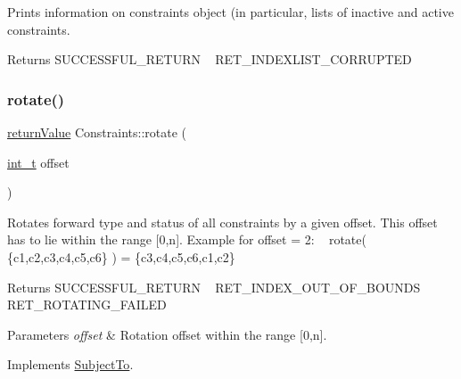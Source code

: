 Prints information on constraints object (in particular, lists of inactive and active constraints. \begin{DoxyReturn}{Returns}
S\+U\+C\+C\+E\+S\+S\+F\+U\+L\+\_\+\+R\+E\+T\+U\+RN ~\newline
 R\+E\+T\+\_\+\+I\+N\+D\+E\+X\+L\+I\+S\+T\+\_\+\+C\+O\+R\+R\+U\+P\+T\+ED 
\end{DoxyReturn}
\mbox{\label{class_constraints_a13958ee91f93760c0cb9d5a47de846f2}} 
\subsubsection{\texorpdfstring{rotate()}{rotate()}}
{\footnotesize\ttfamily \hyperlink{_message_handling_8hpp_a81d556f613bfbabd0b1f9488c0fa865e}{return\+Value} Constraints\+::rotate (\begin{DoxyParamCaption}\item[{\hyperlink{_types_8hpp_ab6fd6105e64ed14a0c9281326f05e623}{int\+\_\+t}}]{offset }\end{DoxyParamCaption})\hspace{0.3cm}{\ttfamily [virtual]}}

Rotates forward type and status of all constraints by a given offset. This offset has to lie within the range \mbox{[}0,n\mbox{]}. Example for offset = 2\+: ~\newline
rotate( \{c1,c2,c3,c4,c5,c6\} ) = \{c3,c4,c5,c6,c1,c2\} \begin{DoxyReturn}{Returns}
S\+U\+C\+C\+E\+S\+S\+F\+U\+L\+\_\+\+R\+E\+T\+U\+RN ~\newline
 R\+E\+T\+\_\+\+I\+N\+D\+E\+X\+\_\+\+O\+U\+T\+\_\+\+O\+F\+\_\+\+B\+O\+U\+N\+DS ~\newline
 R\+E\+T\+\_\+\+R\+O\+T\+A\+T\+I\+N\+G\+\_\+\+F\+A\+I\+L\+ED 
\end{DoxyReturn}

\begin{DoxyParams}{Parameters}
{\em offset} & Rotation offset within the range \mbox{[}0,n\mbox{]}. \\
\hline
\end{DoxyParams}


Implements \hyperlink{class_subject_to_a6e3b466f01422cc7361e7a8d1f007aa6}{Subject\+To}.

\mbox{\label{class_constraints_aeeee62fed6ea53444f370f6d4e3596d6}} 

